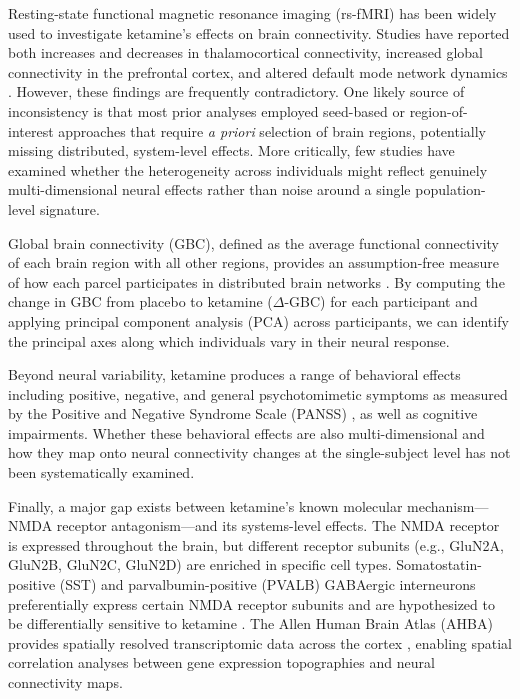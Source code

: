 \documentclass[11pt]{article}
\begin{document}
Resting-state functional magnetic resonance imaging (rs-fMRI) has been widely used to investigate ketamine's effects on brain connectivity. Studies have reported both increases and decreases in thalamocortical connectivity, increased global connectivity in the prefrontal cortex, and altered default mode network dynamics \citep{driesen2013, anticevic2015, abdallah2018}. However, these findings are frequently contradictory. One likely source of inconsistency is that most prior analyses employed seed-based or region-of-interest approaches that require \emph{a priori} selection of brain regions, potentially missing distributed, system-level effects. More critically, few studies have examined whether the heterogeneity across individuals might reflect genuinely multi-dimensional neural effects rather than noise around a single population-level signature.

Global brain connectivity (GBC), defined as the average functional connectivity of each brain region with all other regions, provides an assumption-free measure of how each parcel participates in distributed brain networks \citep{cole2012}. By computing the change in GBC from placebo to ketamine ($\Delta$-GBC) for each participant and applying principal component analysis (PCA) across participants, we can identify the principal axes along which individuals vary in their neural response.

Beyond neural variability, ketamine produces a range of behavioral effects including positive, negative, and general psychotomimetic symptoms as measured by the Positive and Negative Syndrome Scale (PANSS) \citep{kay1987, krystal1994}, as well as cognitive impairments. Whether these behavioral effects are also multi-dimensional and how they map onto neural connectivity changes at the single-subject level has not been systematically examined.

Finally, a major gap exists between ketamine's known molecular mechanism---NMDA receptor antagonism---and its systems-level effects. The NMDA receptor is expressed throughout the brain, but different receptor subunits (e.g., GluN2A, GluN2B, GluN2C, GluN2D) are enriched in specific cell types. Somatostatin-positive (SST) and parvalbumin-positive (PVALB) GABAergic interneurons preferentially express certain NMDA receptor subunits and are hypothesized to be differentially sensitive to ketamine \citep{homayoun2007, moghaddam1997}. The Allen Human Brain Atlas (AHBA) provides spatially resolved transcriptomic data across the cortex \citep{hawrylycz2012}, enabling spatial correlation analyses between gene expression topographies and neural connectivity maps.
\end{document}
